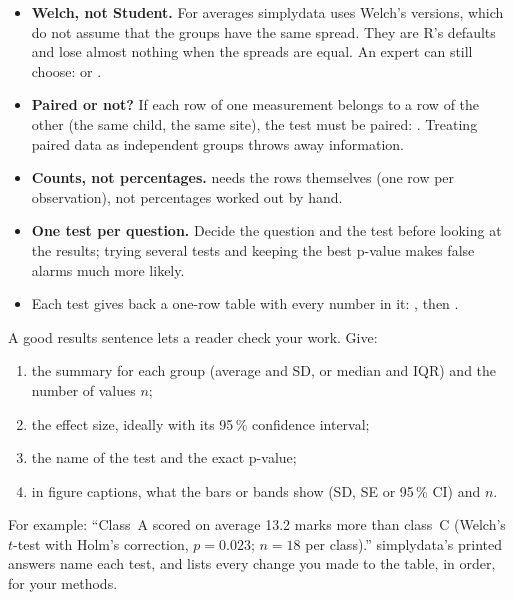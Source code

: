 \begin{goodtoknow}
\begin{itemize}
  \item \textbf{Welch, not Student.} For averages simplydata uses Welch's versions, which do not
    assume that the groups have the same spread. They are R's defaults and lose almost nothing when
    the spreads are equal. An expert can still choose:  or .
  \item \textbf{Paired or not?} If each row of one measurement belongs to a row of the other (the same
    child, the same site), the test must be paired: . Treating paired
    data as independent groups throws away information.
  \item \textbf{Counts, not percentages.}  needs the rows themselves (one row per
    observation), not percentages worked out by hand.
  \item \textbf{One test per question.} Decide the question and the test before looking at the
    results; trying several tests and keeping the best p-value makes false alarms much more
    likely.
  \item Each test gives back a one-row table with every number in it:
    , then .
\end{itemize}
\end{goodtoknow}


A good results sentence lets a reader check your work. Give:
\begin{enumerate}
  \item the summary for each group (average and SD, or median and IQR) and the number of values $n$;
  \item the effect size, ideally with its 95\,\% confidence interval;
  \item the name of the test and the exact p-value;
  \item in figure captions, what the bars or bands show (SD, SE or 95\,\% CI) and $n$.
\end{enumerate}

For example: ``Class~A scored on average 13.2 marks more than class~C (Welch's $t$-test with Holm's
correction, $p = 0.023$; $n = 18$ per class).'' simplydata's printed answers name each test, and
 lists every change you made to the table, in order, for your methods.
